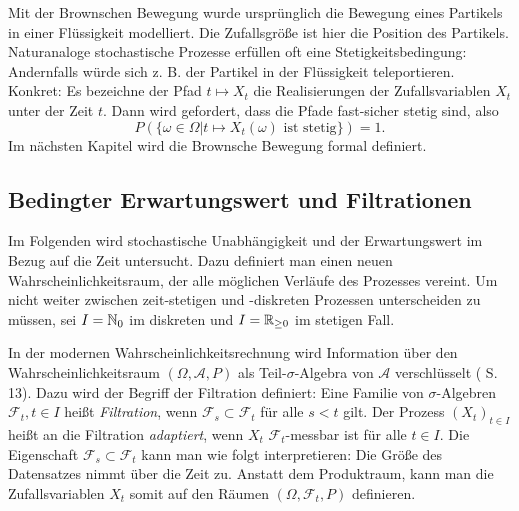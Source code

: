 \begin{bsp}
Mit der Brownschen Bewegung wurde ursprünglich die Bewegung eines Partikels in 
einer Flüssigkeit modelliert. Die Zufallsgröße ist hier die Position des Partikels.
Naturanaloge stochastische Prozesse erfüllen oft eine Stetigkeitsbedingung: 
Andernfalls würde sich z. B. der Partikel in der Flüssigkeit teleportieren. 
Konkret: Es bezeichne der Pfad $t \mapsto X_t$ die Realisierungen der Zufallsvariablen $X_t$ unter 
der Zeit $t$. Dann wird gefordert, dass die Pfade fast-sicher stetig sind, also 
$$P(\{\omega \in \Omega | t \mapsto X_t(\omega) \text{ ist stetig}\}) = 1.$$ 
Im nächsten Kapitel wird die Brownsche Bewegung formal definiert.
\end{bsp}

\subsection{Bedingter Erwartungswert und Filtrationen}

Im Folgenden wird stochastische Unabhängigkeit und der Erwartungswert im Bezug auf die Zeit untersucht. 
Dazu definiert man einen neuen Wahrscheinlichkeitsraum, 
der alle möglichen Verläufe des Prozesses vereint. 
Um nicht weiter zwischen zeit-stetigen und -diskreten Prozessen unterscheiden zu müssen, 
sei $I = \Bbb N_0$ im diskreten und $I = \Bbb R_{\ge 0}$ im stetigen Fall.

\begin{defi}[Adaptiertheit]
In der modernen Wahrscheinlichkeitsrechnung wird Information über den
Wahrscheinlichkeitsraum $(\Omega, \mathcal A, P)$ als Teil-$\sigma$-Algebra 
von $\mathcal A$ verschlüsselt (\cite{behrends} S. 13). Dazu wird der Begriff der Filtration 
definiert: Eine Familie von $\sigma$-Algebren $\mathcal F_t, t \in I$ heißt \textit{Filtration}, 
wenn $\mathcal F_s \subset \mathcal F_t$ für alle $s \lt t$ gilt. 
Der Prozess $(X_t)_{t \in I}$ heißt an die Filtration \textit{adaptiert}, 
wenn $X_t$ $\mathcal F_t$-messbar ist für alle $t \in I$. Die Eigenschaft 
$\mathcal F_s \subset \mathcal F_t$ kann man wie folgt interpretieren: 
Die Größe des Datensatzes nimmt über die Zeit zu. Anstatt dem Produktraum, kann man 
die Zufallsvariablen $X_t$ somit auf den Räumen $(\Omega, \mathcal F_t, P)$ definieren.
\end{defi}

